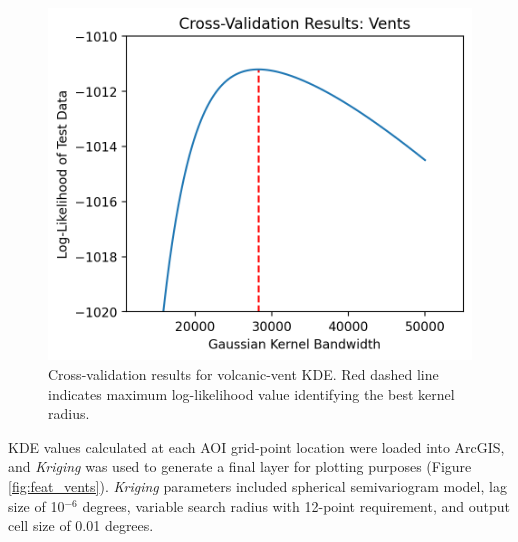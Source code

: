 \begin{figure}[H]
\centering
\includegraphics[scale=.60]{templates/images/Figure-Vents_kde_gridsearchcv_result.png}
\caption[Volcanic-vent density parameter tuning]{Cross-validation results for volcanic-vent KDE. Red dashed line indicates maximum log-likelihood value identifying the best kernel radius.}
\label{fig:vent_cv}
\end{figure}

KDE values calculated at each AOI grid-point location were loaded into ArcGIS, and \textit{Kriging} was used to generate a final layer for plotting purposes (Figure \ref{fig:feat_vents}). \textit{Kriging} parameters included spherical semivariogram model, lag size of 10$^{-6}$ degrees, variable search radius with 12-point requirement, and output cell size of 0.01 degrees. 

